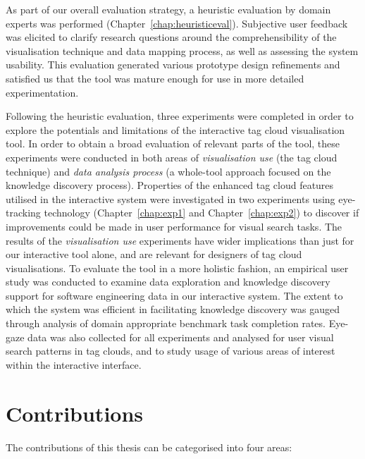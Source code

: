 As part of our overall evaluation strategy, a heuristic evaluation by domain experts was performed (Chapter~\ref{chap:heuristiceval}). Subjective user feedback was elicited to clarify research questions around the comprehensibility of the visualisation technique and data mapping process, as well as assessing the system usability. This evaluation generated various prototype design refinements and satisfied us that the tool was mature enough for use in more detailed experimentation.

Following the heuristic evaluation, three experiments were completed in order to explore the potentials and limitations of the interactive tag cloud visualisation tool. In order to obtain a broad evaluation of relevant parts of the tool, these experiments were conducted in both areas of \emph{visualisation use} (the tag cloud technique) and \emph{data analysis process} (a whole-tool approach focused on the knowledge discovery process). Properties of the enhanced tag cloud features utilised in the interactive system were investigated in two experiments using eye-tracking technology (Chapter~\ref{chap:exp1} and Chapter~\ref{chap:exp2}) to discover if improvements could be made in user performance for visual search tasks.  The results of the \emph{visualisation use} experiments have wider implications than just for our interactive tool alone, and are relevant for designers of tag cloud visualisations. To evaluate the tool in a more holistic fashion, an empirical user study was conducted to examine data exploration and knowledge discovery support for software engineering data in our interactive system. The extent to which the system was efficient in facilitating knowledge discovery was gauged through analysis of domain appropriate benchmark task completion rates. Eye-gaze data was also collected for all experiments and analysed for user visual search patterns in tag clouds, and to study usage of various areas of interest within the interactive interface. 

\section{Contributions}

The contributions of this thesis can be categorised into four areas: 


